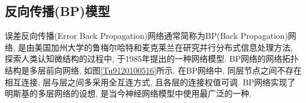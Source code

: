 \subsection{反向传播(BP)模型}
误差反向传播(Error Back Propagation)网络通常简称为BP(Back Propagation)网络, 是由美国加州大学的鲁梅尔哈特和麦克莱兰在研究并行分布式信息处理方法, 探索人类认知微结构的过程中, 于1985年提出的一种网络模型.
BP网络的网络拓扑结构是多层前向网络, 如图\ref{Tu9120100516}所示. 在BP网络中, 同层节点之间不存在相互连接, 层与层之间多采用全互连方式, 且各层的连接权值可调. BP网络实现了明斯基的多层网络的设想, 是当今神经网络模型中使用最广泛的一种.
